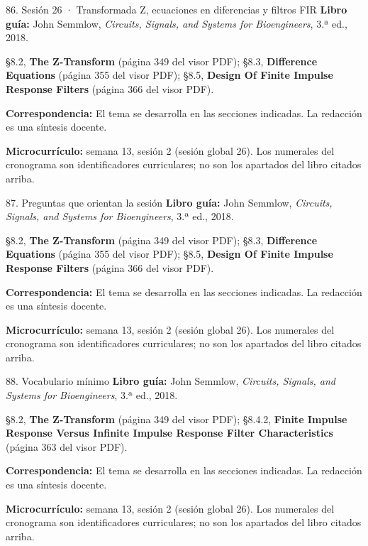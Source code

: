 \documentclass[
  10pt,
  ignorenonframetext,
  aspectratio=169,
  spanish,
]{beamer}
\begin{document}
\begin{frame}{86. Sesión 26 · Transformada Z, ecuaciones en diferencias
y filtros FIR}
\label{sesiuxf3n-26-transformada-z-ecuaciones-en-diferencias-y-filtros-fir}
\textbf{Libro guía:} John Semmlow, \emph{Circuits, Signals, and Systems
for Bioengineers}, 3.ª ed., 2018.

§8.2, \textbf{The Z-Transform} (página 349 del visor PDF); §8.3,
\textbf{Difference Equations} (página 355 del visor PDF); §8.5,
\textbf{Design Of Finite Impulse Response Filters} (página 366 del visor
PDF).

\textbf{Correspondencia:} El tema se desarrolla en las secciones
indicadas. La redacción es una síntesis docente.

\textbf{Microcurrículo:} semana 13, sesión 2 (sesión global 26). Los
numerales del cronograma son identificadores curriculares; no son los
apartados del libro citados arriba.
\end{frame}

\begin{frame}{87. Preguntas que orientan la sesión}
\label{preguntas-que-orientan-la-sesiuxf3n-5}
\textbf{Libro guía:} John Semmlow, \emph{Circuits, Signals, and Systems
for Bioengineers}, 3.ª ed., 2018.

§8.2, \textbf{The Z-Transform} (página 349 del visor PDF); §8.3,
\textbf{Difference Equations} (página 355 del visor PDF); §8.5,
\textbf{Design Of Finite Impulse Response Filters} (página 366 del visor
PDF).

\textbf{Correspondencia:} El tema se desarrolla en las secciones
indicadas. La redacción es una síntesis docente.

\textbf{Microcurrículo:} semana 13, sesión 2 (sesión global 26). Los
numerales del cronograma son identificadores curriculares; no son los
apartados del libro citados arriba.
\end{frame}

\begin{frame}{88. Vocabulario mínimo}
\label{vocabulario-muxednimo-5}
\textbf{Libro guía:} John Semmlow, \emph{Circuits, Signals, and Systems
for Bioengineers}, 3.ª ed., 2018.

§8.2, \textbf{The Z-Transform} (página 349 del visor PDF); §8.4.2,
\textbf{Finite Impulse Response Versus Infinite Impulse Response Filter
Characteristics} (página 363 del visor PDF).

\textbf{Correspondencia:} El tema se desarrolla en las secciones
indicadas. La redacción es una síntesis docente.

\textbf{Microcurrículo:} semana 13, sesión 2 (sesión global 26). Los
numerales del cronograma son identificadores curriculares; no son los
apartados del libro citados arriba.
\end{frame}
\end{document}
